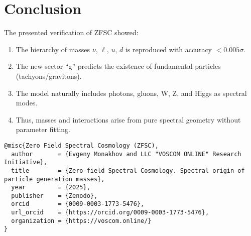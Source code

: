\documentclass[12pt,a4paper]{article}
\begin{document}
\section{Conclusion}
The presented verification of ZFSC showed: 
\begin{enumerate}
\item The hierarchy of masses $\nu$, $\ell$, $u$, $d$ is reproduced with accuracy $<0.005\sigma$. 
\item The new sector ``g'' predicts the existence of fundamental particles (tachyons/gravitons). 
\item The model naturally includes photons, gluons, W, Z, and Higgs as spectral modes. 
\item Thus, masses and interactions arise from pure spectral geometry without parameter fitting. 
\end{enumerate}

\begin{verbatim}
@misc{Zero Field Spectral Cosmology (ZFSC),
  author       = {Evgeny Monakhov and LLC "VOSCOM ONLINE" Research Initiative},
  title        = {Zero-field Spectral Cosmology. Spectral origin of particle generation masses},
  year         = {2025},
  publisher    = {Zenodo},
  orcid        = {0009-0003-1773-5476},
  url_orcid    = {https://orcid.org/0009-0003-1773-5476},
  organization = {https://voscom.online/}
}
\end{verbatim}
\end{document}
